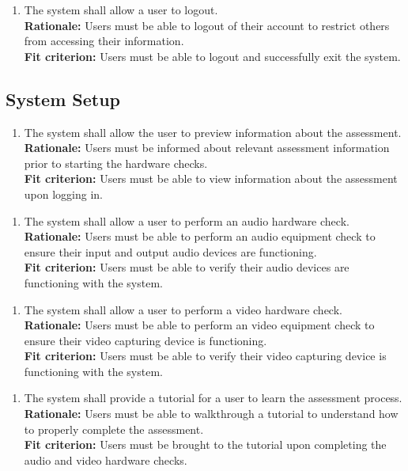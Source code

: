 \documentclass[12pt]{article}
\begin{document}
\begin{enumerate}[{FR-A}5. ]
  \item The system shall allow a user to logout.\\
  \textbf{Rationale: }Users must be able to logout of their account to restrict others from accessing their information.\\
  \textbf{Fit criterion: }Users must be able to logout and successfully exit the system.
\end{enumerate}

\subsection{System Setup}
\begin{enumerate}[{FR-SS}1. ]
  \item The system shall allow the user to preview information about the assessment.\\
  \textbf{Rationale: }Users must be informed about relevant assessment information prior to starting the hardware checks.\\
  \textbf{Fit criterion: }Users must be able to view information about the assessment upon logging in.
\end{enumerate}
\begin{enumerate}[{FR-SS}2. ]
  \item The system shall allow a user to perform an audio hardware check.\\
  \textbf{Rationale: }Users must be able to perform an audio equipment check to ensure their input and output audio devices are functioning.\\
  \textbf{Fit criterion: }Users must be able to verify their audio devices are functioning with the system.
\end{enumerate}
\begin{enumerate}[{FR-SS}3. ]
  \item The system shall allow a user to perform a video hardware check.\\
  \textbf{Rationale: }Users must be able to perform an video equipment check to ensure their video capturing device is functioning.\\
  \textbf{Fit criterion: }Users must be able to verify their video capturing device is functioning with the system.  
\end{enumerate}
\begin{enumerate}[{FR-SS}4. ]
  \item The system shall provide a tutorial for a user to learn the assessment process.\\
  \textbf{Rationale: }Users must be able to walkthrough a tutorial to understand how to properly complete the assessment.\\
  \textbf{Fit criterion: }Users must be brought to the tutorial upon completing the audio and video hardware checks.  
\end{enumerate}
\end{document}
